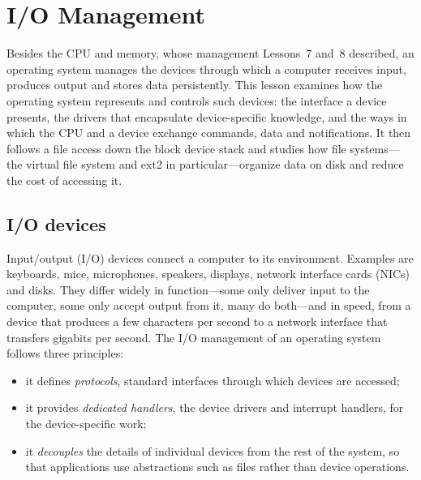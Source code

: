 \documentclass[../main.tex]{subfiles}
\begin{document}
\chapter{I/O Management}

Besides the CPU and memory, whose management Lessons~7 and~8 described, an
operating system manages the devices through which a computer receives
input, produces output and stores data persistently.  This lesson examines
how the operating system represents and controls such devices: the
interface a device presents, the drivers that encapsulate device-specific
knowledge, and the ways in which the CPU and a device exchange commands,
data and notifications.  It then follows a file access down the block
device stack and studies how file systems---the virtual file system and ext2
in particular---organize data on disk and reduce the cost of accessing it.

\section{I/O devices}
\label{sec:l11-devices}

Input/output (I/O) devices connect a computer to its environment.  Examples are keyboards, mice, microphones,
speakers, displays, network interface cards (NICs) and disks.  They differ
widely in function---some only
deliver input to the computer, some only accept output from it, many do
both---and in speed, from a device that produces a few characters per second
to a network interface that transfers gigabits per second.  The I/O
management of an operating system follows three principles:
\begin{itemize}
  \item it defines \emph{protocols}, standard interfaces through which
    devices are accessed;
  \item it provides \emph{dedicated handlers}, the device drivers and
    interrupt handlers, for the device-specific work;
  \item it \emph{decouples} the details of individual devices from the rest
    of the system, so that applications use abstractions such as files
    rather than device operations.
\end{itemize}
\end{document}

